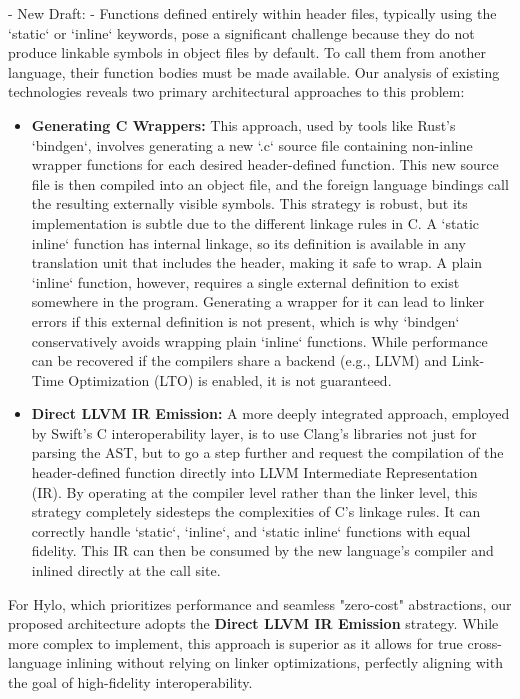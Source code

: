 - New Draft: -
Functions defined entirely within header files, typically using the `static` or `inline` keywords, pose a significant challenge because they do not produce linkable symbols in object files by default. To call them from another language, their function bodies must be made available. Our analysis of existing technologies reveals two primary architectural approaches to this problem:
\begin{itemize}
    \item \textbf{Generating C Wrappers:} This approach, used by tools like Rust's `bindgen`, involves generating a new `.c` source file containing non-inline wrapper functions for each desired header-defined function. This new source file is then compiled into an object file, and the foreign language bindings call the resulting externally visible symbols. This strategy is robust, but its implementation is subtle due to the different linkage rules in C. A `static inline` function has internal linkage, so its definition is available in any translation unit that includes the header, making it safe to wrap. A plain `inline` function, however, requires a single external definition to exist somewhere in the program. Generating a wrapper for it can lead to linker errors if this external definition is not present, which is why `bindgen` conservatively avoids wrapping plain `inline` functions. While performance can be recovered if the compilers share a backend (e.g., LLVM) and Link-Time Optimization (LTO) is enabled, it is not guaranteed.
    \item \textbf{Direct LLVM IR Emission:} A more deeply integrated approach, employed by Swift's C interoperability layer, is to use Clang's libraries not just for parsing the AST, but to go a step further and request the compilation of the header-defined function directly into LLVM Intermediate Representation (IR). By operating at the compiler level rather than the linker level, this strategy completely sidesteps the complexities of C's linkage rules. It can correctly handle `static`, `inline`, and `static inline` functions with equal fidelity. This IR can then be consumed by the new language's compiler and inlined directly at the call site.
\end{itemize}
For Hylo, which prioritizes performance and seamless "zero-cost" abstractions, our proposed architecture adopts the \textbf{Direct LLVM IR Emission} strategy. While more complex to implement, this approach is superior as it allows for true cross-language inlining without relying on linker optimizations, perfectly aligning with the goal of high-fidelity interoperability.


